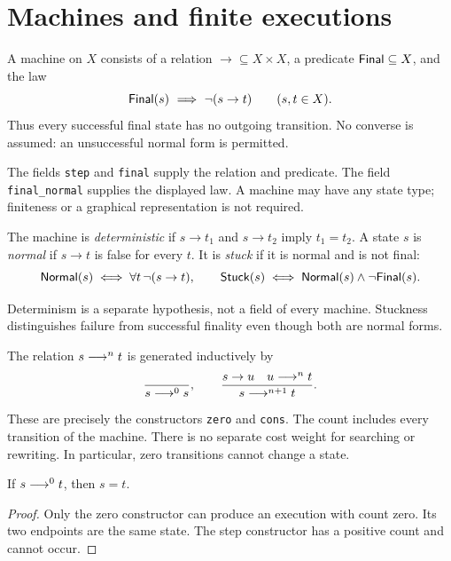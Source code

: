 \section{Machines and finite executions}

\begin{definition}[Machine]\label{term:machine}
A machine on $X$ consists of a relation ${\to}\subseteq X\times X$, a
predicate $\mathsf{Final}\subseteq X$, and the law
\[
  \mathsf{Final}(s)\ \Longrightarrow\ \neg(s\to t)\qquad(s,t\in X).
\]
Thus every successful final state has no outgoing transition. No converse is
assumed: an unsuccessful normal form is permitted.
\end{definition}
The fields \texttt{step} and \texttt{final} supply the relation and predicate.
The field \texttt{final\_normal} supplies the displayed law. A machine may
have any state type; finiteness or a graphical representation is not required.

\begin{definition}\label{term:determinism}
The machine is \emph{deterministic} if $s\to t_1$ and $s\to t_2$ imply
$t_1=t_2$. A state $s$ is \emph{normal} if $s\to t$ is false for every
$t$. It is \emph{stuck} if it is normal and is not final:
\[
 \mathsf{Normal}(s)\iff\forall t\,\neg(s\to t),\qquad
 \mathsf{Stuck}(s)\iff\mathsf{Normal}(s)\land\neg\mathsf{Final}(s).
\]
\end{definition}
Determinism is a separate hypothesis, not a field of every machine. Stuckness
distinguishes failure from successful finality even though both are normal
forms.

\begin{definition}\label{term:execution}
The relation $s\mathrel{\longrightarrow^{n}}t$ is generated inductively by
\[
 \frac{}{s\mathrel{\longrightarrow^{0}}s},\qquad
 \frac{s\to u\quad u\mathrel{\longrightarrow^{n}}t}{s\mathrel{\longrightarrow^{n+1}}t}.
\]
\end{definition}
These are precisely the constructors \texttt{zero} and \texttt{cons}. The
count includes every transition of the machine. There is no separate cost
weight for searching or rewriting. In particular, zero transitions cannot
change a state.

\begin{lemma}
If $s\mathrel{\longrightarrow^{0}}t$, then $s=t$.
\end{lemma}
\begin{proof}
Only the zero constructor can produce an execution with count zero. Its two
endpoints are the same state. The step constructor has a positive count and
cannot occur.
\end{proof}


